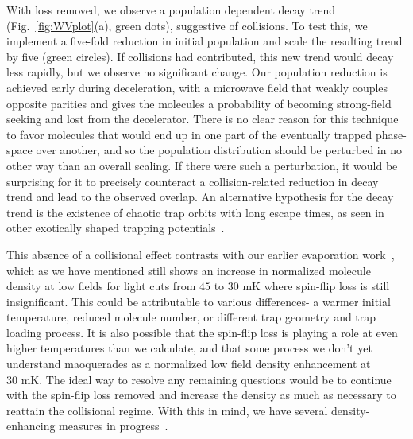 \documentclass[%
 reprint,
groupedaddress,
 amsmath,amssymb,
 aps,
prl,
]{revtex4-1}
\begin{document}
With loss removed, we observe a population dependent decay trend (Fig.~\ref{fig:WVplot}(a), green dots), suggestive of collisions. To test this, we implement a five-fold reduction in initial population and scale the resulting trend by five (green circles). If collisions had contributed, this new trend would decay less rapidly, but we observe no significant change. Our population reduction is achieved early during deceleration, with a microwave field that weakly couples opposite parities and gives the molecules a probability of becoming strong-field seeking and lost from the decelerator. There is no clear reason for this technique to favor molecules that would end up in one part of the eventually trapped phase-space over another, and so the population distribution should be perturbed in no other way than an overall scaling. If there were such a perturbation, it would be surprising for it to precisely counteract a collision-related reduction in decay trend and lead to the observed overlap. An alternative hypothesis for the decay trend is the existence of chaotic trap orbits with long escape times, as seen in other exotically shaped trapping potentials~\cite{Gonzalez-Ferez2014}.

This absence of a collisional effect contrasts with our earlier evaporation work~\cite{Stuhl2012evap}, which as we have mentioned still shows an increase in normalized molecule density at low fields for light cuts from $45$ to $30\text{ mK}$ where spin-flip loss is still insignificant. This could be attributable to various differences- a warmer initial temperature, reduced molecule number, or different trap geometry and trap loading process. It is also possible that the spin-flip loss is playing a role at even higher temperatures than we calculate, and that some process we don't yet understand maoquerades as a normalized low field density enhancement at $30\text{ mK}$. The ideal way to resolve any remaining questions would be to continue with the spin-flip loss removed and increase the density as much as necessary to reattain the collisional regime. With this in mind, we have several density-enhancing measures in progress~\cite{}.

\end{document}
